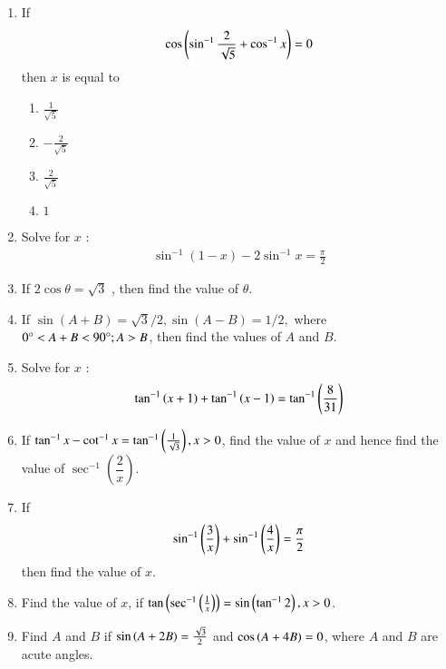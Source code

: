 \begin{enumerate}[label=\thesubsection.\arabic*,ref=\thesubsection.\theenumi,itemsep=1pt]
\item
If
\begin{align*}
\cos\left(\sin^{-1}{\frac{2}{\sqrt{5}}} + \cos^{-1}{x}\right) = 0
\end{align*}
then $x$ is equal to
		\begin{multicols}{4}
\begin{enumerate}
	\item $\frac{1}{\sqrt{5}}$
	\item $-\frac{2}{\sqrt{5}}$
	\item $\frac{2}{\sqrt{5}}$
        \item $1$
\end{enumerate}
		\end{multicols}
\hfill{}
\item Solve for $x$ :
    \begin{align*}
        \sin^{-1}(1-x) - 2 \sin^{-1} x = \frac{\pi}{2}
    \end{align*}
\hfill{}
\item If $2\cos  \theta = \sqrt{3}$ , then find the value of $\theta$.
\hfill{}
\item If  $\sin (A+B) = \sqrt{3}/2,
 \sin (A-B) = 1/2,$ where $0\degree<A+B<90\degree; A>B$, then find the values of $A$ and $B$.
\hfill{}
\item Solve for $x$ :
\begin{align*}
\tan^{-1}\left(x+1\right)+\tan^{-1}\left(x-1\right)=\tan^{-1}\left(\frac{8}{31}\right)
\end{align*}
\hfill{}
%
\item If $\tan^{-1}x-\cot^{-1}x =\tan^{-1}\left(\frac{1}{ \sqrt3}\right), x>0$, find the value of $x$ and hence find the value of $\sec^{-1}\left(\dfrac{2}{x}\right)$.
\hfill{}\item  If
\begin{align*}
 \sin^{-1} \left(\dfrac{3}{x}\right) + \sin^{-1}\left(\dfrac{4}{x}\right)=\dfrac{\pi}{2} 
\end{align*}
then find the value of $x$. 
%
\hfill{}\item Find the value of $x$, if $\tan \left(\sec^{-1}\left(\frac{1}{x}\right)\right) = \sin \left(\tan^{-1}{2}\right),x > 0$.
\hfill{}
%
\item Find $A$ and $B$ if $\sin \left(A + 2B\right)=\frac{\sqrt{3}}{2}$ and $\cos \left(A + 4B\right) = 0$, where $A$ and $B$ are acute angles.
\hfill{}

\end{enumerate}
